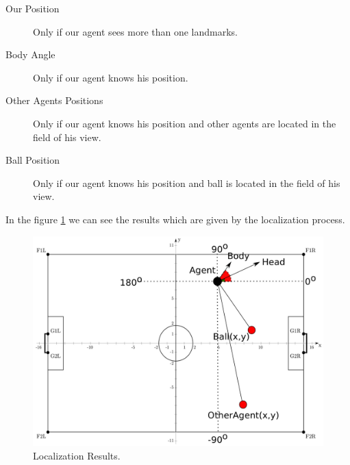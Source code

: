 \begin{description}
	\item[Our Position] Only if our agent sees more than one landmarks.
	\item[Body Angle] Only if our agent knows his position.
	\item[Other Agents Positions]	Only if our agent knows his position and other agents are located in the field of his view.
	\item[Ball Position] Only if our agent knows his position and ball is located in the field of his view.
\end{description}
In the figure \ref{fig:LocalizationResults} we can see the results which are given by the localization process.
\begin{figure}[htb!]
\centering
  \includegraphics[scale=0.5]{Chapter3/figures/LocalizationResults.pdf}
  \caption{Localization Results.} 
  \label{fig:LocalizationResults}
\end{figure}
\hfill









